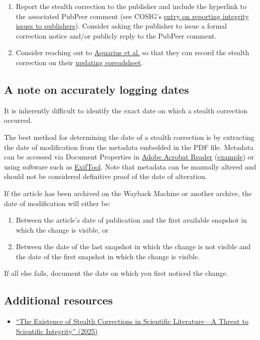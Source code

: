 \documentclass[letterpaper, 12pt]{article}
\begin{document}
\begin{enumerate}
    \item Report the stealth correction to the publisher and include the hyperlink to the associated PubPeer comment (see COSIG's \href{https://osf.io/4edk2}{entry on reporting integrity issues to publishers}). Consider asking the publisher to issue a formal correction notice and/or publicly reply to the PubPeer comment.

    \item Consider reaching out to \href{https://doi.org/10.1002/leap.1660}{Aquarius et al.} so that they can record the stealth correction on their \href{https://docs.google.com/spreadsheets/d/1vmoHAQf1TY6y6lwc8ZI8BxPplfgdeIyGSTauGf3Si2c/edit?usp=sharing}{updating spreadsheet}.
    
\end{enumerate}

\subsection*{A note on accurately logging dates}

It is inherently difficult to identify the exact date on which a stealth correction occurred.

The best method for determining the date of a stealth correction is by extracting the date of modification from the metadata embedded in the PDF file. Metadata can be accessed via Document Properties in \href{https://www.adobe.com/acrobat/pdf-reader.html}{Adobe Acrobat Reader} (\href{}{example}) or using software such as \href{https://exiftool.org/}{ExifTool}. Note that metadata can be manually altered and should not be considered definitive proof of the date of alteration.
    
If the article has been archived on the Wayback Machine or another archive, the date of modification will either be:
\begin{enumerate}
        \setlength\itemsep{-0.5em}
        \item Between the article's date of publication and the first available snapshot in which the change is visible, or
        \item Between the date of the last snapshot in which the change is not visible and the date of the first snapshot in which the change is visible.
    \end{enumerate}
    
If all else fails, document the date on which you first noticed the change.

\subsection*{Additional resources}

\begin{itemize}
    \setlength\itemsep{-0.5em}
    \item \href{https://doi.org/10.1002/leap.1660}{``The Existence of Stealth Corrections in Scientific Literature—A Threat to Scientific Integrity'' (2025)}

\end{itemize}
\end{document}
